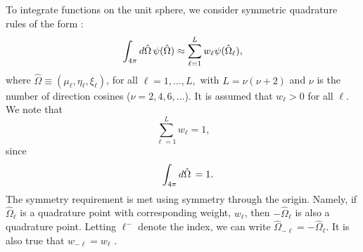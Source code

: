 To integrate functions on the unit sphere, we consider symmetric quadrature rules of the form \cite{carlson1965transport}:
\begin{equation}
	\int_{4\pi} \mathop{}\!d \hat{\Omega} \, \psi(\hat{\Omega}) \approx \sum_{\ell = 1}^{L} w_{\ell} \psi(\hat{\Omega}_{\ell}),
\end{equation}
where $\hat{\Omega} \equiv (\mu_{\ell}, \eta_{\ell}, \xi_{\ell})$, for all $\ell = 1, \dots, L,$ with $L = \nu(\nu+2)$ and $\nu$ is the number of direction cosines ($\nu = 2, 4, 6, \dots$). It is assumed that $w_{\ell} > 0$ for all $\ell$. We note that
\begin{equation}
\sum_{\ell = 1}^{L} w_{\ell} = 1,
\end{equation}
since
\begin{equation}
\quad \int_{4\pi} \mathop{}\!d \hat{\Omega} \, = 1.
\end{equation}
The symmetry requirement is met using symmetry through the origin. Namely, if $\hat{\Omega}_{\ell}$ is a quadrature point with corresponding weight, $w_{\ell}$, then $-\hat{\Omega}_{\ell}$ is also a quadrature point. Letting $\ell^{-}$ denote the index, we can write $\hat{\Omega}_{-\ell} = -\hat{\Omega}_{\ell}$. It is also true that $w_{-\ell} = w_{\ell}$ \cite{carlson1965transport}.

